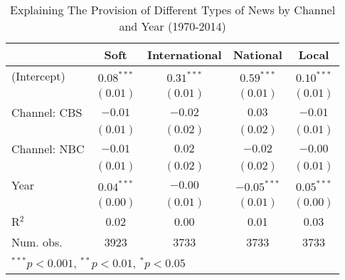 
\begin{table}
\caption{Explaining The Provision of Different Types of News by Channel and Year (1970-2014)}
\begin{center}
\begin{tabular}{l c c c c }
\hline
 & Soft & International & National & Local \\
\hline
(Intercept)  & $0.08^{***}$ & $0.31^{***}$ & $0.59^{***}$  & $0.10^{***}$ \\
             & $(0.01)$     & $(0.01)$     & $(0.01)$      & $(0.01)$     \\
Channel: CBS & $-0.01$      & $-0.02$      & $0.03$        & $-0.01$      \\
             & $(0.01)$     & $(0.02)$     & $(0.02)$      & $(0.01)$     \\
Channel: NBC & $-0.01$      & $0.02$       & $-0.02$       & $-0.00$      \\
             & $(0.01)$     & $(0.02)$     & $(0.02)$      & $(0.01)$     \\
Year         & $0.04^{***}$ & $-0.00$      & $-0.05^{***}$ & $0.05^{***}$ \\
             & $(0.00)$     & $(0.01)$     & $(0.01)$      & $(0.00)$     \\
\hline
R$^2$        & 0.02         & 0.00         & 0.01          & 0.03         \\
Num. obs.    & 3923         & 3733         & 3733          & 3733         \\
\hline
\multicolumn{5}{l}{\scriptsize{$^{***}p<0.001$, $^{**}p<0.01$, $^*p<0.05$}}
\end{tabular}
\label{tab:news_over_time_7014}
\end{center}
\end{table}
